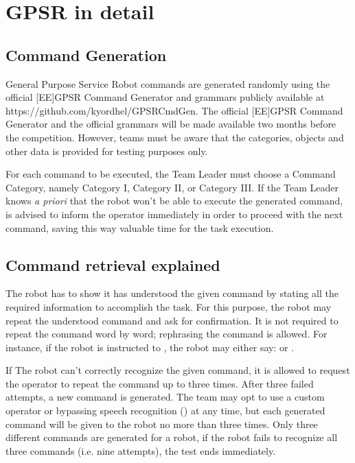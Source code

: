 \chapter{GPSR in detail}
\label{chap:gpsr-appendix}

\section{Command Generation}
General Purpose Service Robot commands are generated randomly using the official [EE]GPSR Command Generator and grammars publicly available at https://github.com/kyordhel/GPSRCmdGen. The official [EE]GPSR Command Generator and the official grammars will be made available two months before the competition. However, teams must be aware that the categories, objects and other data is provided for testing purposes only.

For each command to be executed, the Team Leader must choose a Command Category, namely Category I, Category II, or Category III. If the Team Leader knows \textit{a priori} that the robot won't be able to execute the generated command, is advised to inform the operator immediately in order to proceed with the next command, saving this way valuable time for the task execution.

\section{Command retrieval explained}
The robot has to show it has understood the given command by stating all the required information to accomplish the task. For this purpose, the robot may repeat the understood command and ask for confirmation. It is not required to repeat the command word by word; rephrasing the command is allowed. For instance, if the robot is instructed to , the robot may either say: \textit{} or \textit{}.

If The robot can't correctly recognize the given command, it is allowed to request the operator to repeat the command up to three times. After three failed attempts, a new command is generated. The team may opt to use a custom operator or bypassing speech recognition () at any time, but each generated command will be given to the robot no more than three times. Only three different commands are generated for a robot, if the robot fails to recognize all three commands (i.e. nine attempts), the test ends immediately.

